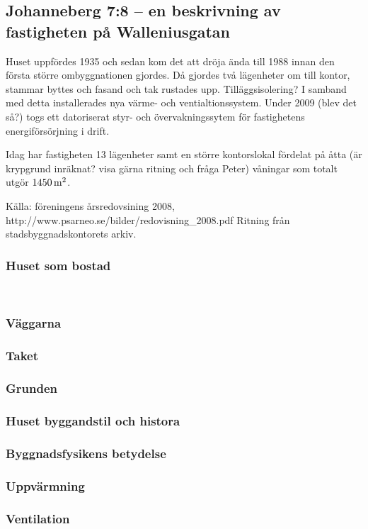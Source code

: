 \subsection{Johanneberg 7:8 – en beskrivning av fastigheten på Walleniusgatan}

Huset uppfördes 1935 och sedan kom det att dröja ända till 1988 innan den första större ombyggnationen gjordes. Då gjordes två lägenheter om till kontor, stammar byttes och fasand och tak rustades upp. Tilläggsisolering? I samband med detta installerades nya värme- och ventialtionssystem. Under 2009 (blev det så?) togs ett datoriserat styr- och övervakningssytem för fastighetens energiförsörjning i drift.

Idag har fastigheten 13 lägenheter samt en större kontorslokal fördelat på åtta (är krypgrund inräknat? visa gärna ritning och fråga Peter) våningar som totalt utgör $\unit[1450]{m^2}$.

Källa:
föreningens årsredovsining 2008, http://www.psarneo.se/bilder/redovisning_2008.pdf
Ritning från stadsbyggnadskontorets arkiv.



\subsubsection{Huset som bostad}
  

\subsubsection{Väggarna}

\subsubsection{Taket}

\subsubsection{Grunden}


\subsubsection{Huset byggandstil och histora}

\subsubsection{Byggnadsfysikens betydelse}

\subsubsection{Uppvärmning}

\subsubsection{Ventilation}
